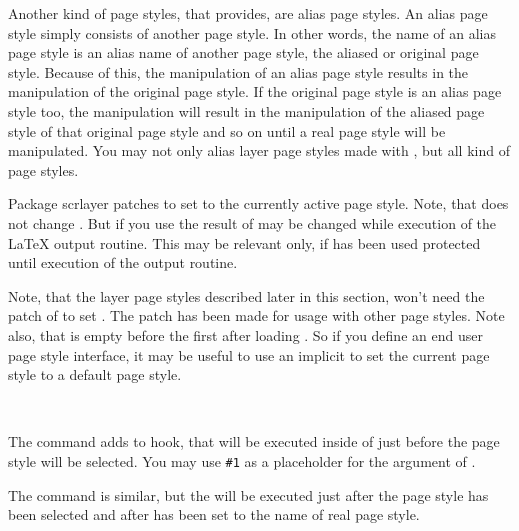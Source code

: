 Another kind of page styles, that  provides, are alias page
styles. An alias page style simply consists of another page style. In other
words, the name of an alias page style is an alias name of another page
style, the aliased or original page style. Because of this, the manipulation
of an alias page style results in the manipulation of the original page
style. If the original page style is an alias page style too, the manipulation
will result in the manipulation of the aliased page style of that original
page style and so on until a real page style will be manipulated. You may not
only alias layer page styles made with , but all kind of
page styles.

\begin{Declaration}
\end{Declaration}
%
Package scrlayer patches  to set  to
the currently active page style. Note, that  does not
change . But if you use  the
result of  may be changed while execution of the
\LaTeX{} output routine. This may be relevant only, if
 has been used protected until execution of the output
routine.

Note, that the layer page styles described later in this section, won't need
the patch of  to set . The patch has
been made for usage with other page styles. Note also, that
 is empty before the first  after
loading . So if you define an end user page style interface,
it may be useful to use an implicit  to set the current page
style to a default page style.%

\begin{Declaration}
  \\
\end{Declaration}
%
%
The command  adds  to hook, that
will be executed inside of  just before the page style will
be selected. You may use \texttt{\#1} as a placeholder for the argument of
.

The command  is similar, but the 
will be executed just after the page style has been selected and after
 has been set to the name of real page style.

